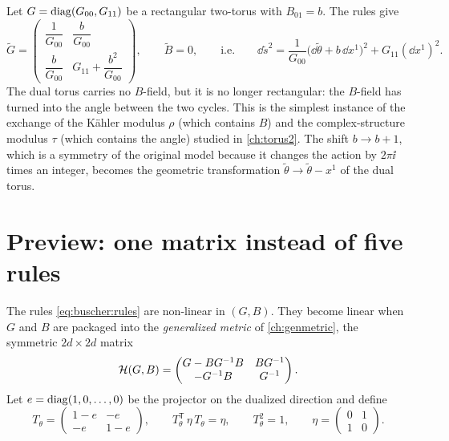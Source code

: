\begin{example}\label{ex:buscher:tilt}
Let $G=\operatorname{diag}(G_{00},G_{11})$ be a rectangular two-torus with $B_{01}=b$. The rules give
\begin{equation}\label{eq:buscher:tilt}
 \tilde G=\begin{pmatrix}\dfrac{1}{G_{00}}&\dfrac{b}{G_{00}}\\[3mm]
   \dfrac{b}{G_{00}}&G_{11}+\dfrac{b^2}{G_{00}}\end{pmatrix},\qquad\tilde B=0,
 \qquad\text{i.e.}\qquad
 \dd\tilde s^2=\frac{1}{G_{00}}\big(\dd\tilde\theta+b\,\dd x^1\big)^2+G_{11}(\dd x^1)^2 .
\end{equation}
The dual torus carries no $B$-field, but it is no longer rectangular: the $B$-field has turned
into the angle between the two cycles. This is the simplest instance of the exchange of the
K\"ahler modulus $\rho$ (which contains $B$) and the complex-structure modulus $\tau$ (which
contains the angle) studied in \cref{ch:torus2}. The shift $b\to b+1$, which is a symmetry
of the original model because it changes the action by $2\pi\ii$ times an integer, becomes
the geometric transformation $\tilde\theta\to\tilde\theta-x^1$ of the dual torus.
\end{example}

\section{Preview: one matrix instead of five rules}\label{sec:buscher:odd}

The rules \eqref{eq:buscher:rules} are non-linear in $(G,B)$. They become linear when $G$ and
$B$ are packaged into the \emph{generalized metric} of
\cref{ch:genmetric}, the symmetric $2d\times2d$ matrix
\begin{equation}\label{eq:buscher:genmetric}
 \mathcal{H}(G,B)=\begin{pmatrix}G-BG^{-1}B&BG^{-1}\\-G^{-1}B&G^{-1}\end{pmatrix}.
\end{equation}
Let $e=\operatorname{diag}(1,0,\dots,0)$ be the projector on the dualized direction and define
\begin{equation}\label{eq:buscher:Ttheta}
 T_\theta=\begin{pmatrix}1-e&-e\\-e&1-e\end{pmatrix},\qquad
 T_\theta^{\mathsf T}\,\eta\,T_\theta=\eta,\qquad T_\theta^2=1,\qquad
 \eta=\begin{pmatrix}0&1\\1&0\end{pmatrix}.
\end{equation}


